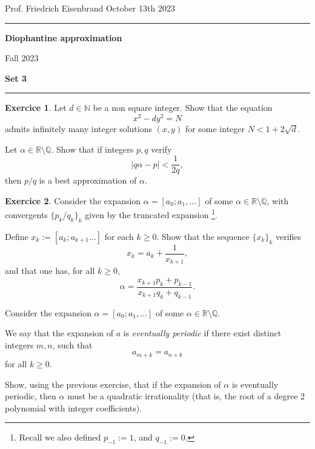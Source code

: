 \documentclass[12pt,a4paper]{article}
\date{}
\theoremstyle{plain}
\newtheorem*{Sol*}{Solution}
\theoremstyle{definition}
\newtheorem{Ex}{Exercice}
\def \N {\mathbb N}
\def \Q {\mathbb Q}
\def \R {\mathbb R}
\newif\ifsolutions
\newcommand{\exercise}[2]{
			\begin{Ex} #1 \end{Ex}
			\ifsolutions  \begin{Sol*} #2 \end{Sol*} \bigskip \else \bigskip  \fi
		}
\begin{document}
\begin{center}
{Prof. Friedrich Eisenbrand \hfill October 13th 2023}
\end{center}
	
\hrule\vspace{\baselineskip}

\begin{center}
\textbf{ Diophantine approximation}

Fall 2023

\bigskip

\textbf{Set 3}
\ifsolutions{\textbf{- Corrig\'e}} \else{} \fi
\end{center}

\hrule\vspace{\baselineskip}



\exercise{
	Let $d \in \N$ be a non square integer. Show that the equation
		\[ x^2 - dy^2 = N \]
	admits infinitely many integer solutions $(x,y)$ for some integer $N < 1 + 2 \sqrt{d}$.
}

\exercise{
	Let $\alpha \in \R\setminus\Q$. Show that if integers $p, q$ verify
		\[ | q \alpha - p | < \frac{1}{2q}, \]
	then $p/q$ is a best approximation of $\alpha$.
}

\exercise{
	Consider the expansion $\alpha = [a_0; a_1, \dots]$ of some $\alpha \in \R\setminus\Q$, with convergents $\{p_{k}/q_{k}\}_k$ given by the truncated expansion \footnote{Recall we also defined $p_{-1} := 1$, and $q_{-1} := 0$.}.

	Define $x_k := [a_k; a_{k+1} \dots]$ for each $k\geq0$. Show that the sequence $\{x_k\}_k$ verifies
		\[ x_k = a_k + \frac{1}{x_{k+1}}, \]
	and that one has, for all $k\geq0$, 
		\[ \alpha = \frac{x_{k+1}p_k + p_{k-1}}{x_{k+1}q_k + q_{k-1}}. \]
}

\exercise{
	Consider the expansion $\alpha = [a_0; a_1, \dots]$ of some $\alpha \in \R\setminus\Q$.

	We say that the expansion of $a$ is \emph{eventually periodic} if there exist distinct integers $m, n$, such that
		\[ a_{m+k} = a_{n+k} \]
	for all $k\geq0$.

	Show, using the previous exercise, that if the expansion of $\alpha$ is eventually periodic, then $\alpha$ must be a quadratic irrationality (that is, the root of a degree 2 polynomial with integer coefficients).
}
\end{document}
